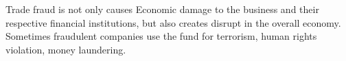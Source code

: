 


Trade fraud is not only causes Economic damage to the business and their respective financial institutions, but also creates disrupt in the overall economy. Sometimes fraudulent companies use the fund for terrorism, human rights violation, money laundering.